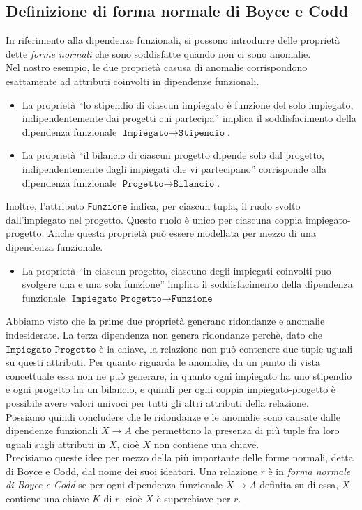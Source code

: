 \documentclass[12pt]{report}
\begin{document}
	\subsection{Definizione di forma normale di Boyce e Codd}
	In riferimento alla dipendenze funzionali, si possono introdurre delle proprietà dette \textit{forme normali} che sono soddisfatte quando non ci sono anomalie. \\
	Nel nostro esempio, le due proprietà casusa di anomalie corrispondono esattamente ad attributi coinvolti in dipendenze funzionali.
	\begin{itemize}
		\item La proprietà ``lo stipendio di ciascun impiegato è funzione del solo impiegato, indipendentemente dai progetti cui partecipa'' implica il soddisfacimento della dipendenza funzionale $\texttt{Impiegato} \to \texttt{Stipendio}$.
		\item La proprietà ``il bilancio di ciascun progetto dipende solo dal progetto, indipendentemente dagli impiegati che vi partecipano'' corrisponde alla dipendenza funzionale $\texttt{Progetto} \to \texttt{Bilancio}$.
	\end{itemize}
	Inoltre, l'attributo \texttt{Funzione} indica, per ciascun tupla, il ruolo svolto dall'impiegato nel progetto. Questo ruolo è unico per ciascuna coppia impiegato-progetto. Anche questa proprietà può essere modellata per mezzo di una dipendenza funzionale.
	\begin{itemize}
		\item La proprietà ``in ciascun progetto, ciascuno degli impiegati coinvolti puo svolgere una e una sola funzione'' implica il soddisfacimento della dipendenza funzionale $\texttt{Impiegato Progetto} \to \texttt{Funzione}$
	\end{itemize}
	Abbiamo visto che la prime due proprietà generano ridondanze e anomalie indesiderate. La terza dipendenza non genera ridondanze perchè, dato che $\texttt{Impiegato Progetto}$ è la chiave, la relazione non può contenere due tuple uguali su questi attributi. Per quanto riguarda le anomalie, da un punto di vista concettuale essa non ne può generare, in quanto ogni impiegato ha uno stipendio e ogni progetto ha un bilancio, e quindi per ogni coppia impiegato-progetto è possibile avere valori univoci per tutti gli altri attributi della relazione. \\
	Possiamo quindi concludere che le ridondanze e le anomalie sono causate dalle dipendenze funzionali $X \to A$ che permettono la presenza di più tuple fra loro uguali sugli attributi in $X$, cioè $X$ non contiene una chiave. \\
	Precisiamo queste idee per mezzo della più importante delle forme normali, detta di Boyce e Codd, dal nome dei suoi ideatori. Una relazione $r$ è in \textit{forma normale di Boyce e Codd} se per ogni dipendenza funzionale $X \to A$ definita su di essa, $X$ contiene una chiave $K$ di $r$, cioè $X$ è superchiave per $r$.
\end{document}
